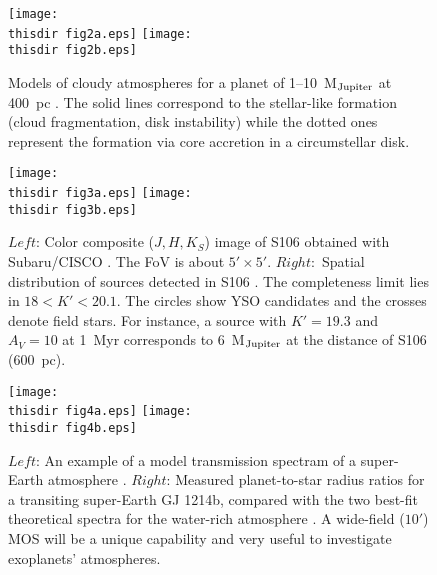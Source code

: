 \begin{figure}
\centerline{
\texttt{[image: \\thisdir fig2a.eps]}
\hspace{10mm}
\texttt{[image: \\thisdir fig2b.eps]}
}
\caption{Models of cloudy atmospheres for a planet of 1--10~M$_{\rm
 Jupiter}$ at 400~pc \citep{spi12}. The solid lines correspond to the
 stellar-like formation (cloud fragmentation, disk instability) while
 the dotted ones represent the formation via core accretion in a
 circumstellar disk.}
\label{fig:models}
\end{figure}

\begin{figure}
\centerline{
\texttt{[image: \\thisdir fig3a.eps]}
\hspace{5mm}
\texttt{[image: \\thisdir fig3b.eps]}
}
\caption{$Left$: Color composite ($J, H, K_S$) image of S106 obtained
 with Subaru/CISCO \citep{oas06}. The FoV is about $5' \times
 5'$. $Right:$ Spatial distribution of sources detected in S106
 \citep{oas06}. The completeness limit lies in $18 < K' < 20.1$. The
 circles show YSO candidates and the crosses denote field stars. For
 instance, a source with $K'=19.3$ and $A_V=10$ at 1~Myr corresponds to
 6~M$_{\rm Jupiter}$ at the distance of S106 (600~pc).}
\label{fig:spatial_dist}
\end{figure}

\begin{figure}
\centerline{
\texttt{[image: \\thisdir fig4a.eps]}
\hspace{10mm}
\texttt{[image: \\thisdir fig4b.eps]}
}
\caption{$Left$: An example of a model transmission spectram of a
 super-Earth atmosphere \citep{ben12}. $Right$: Measured planet-to-star
 radius ratios for a transiting super-Earth GJ 1214b, compared with the
 two best-fit theoretical spectra for the water-rich atmosphere
 \citep{nar13}. A wide-field ($10'$) MOS will be a unique capability and
 very useful to investigate exoplanets' atmospheres.}
\label{fig:trans_spec}
\end{figure}




%

